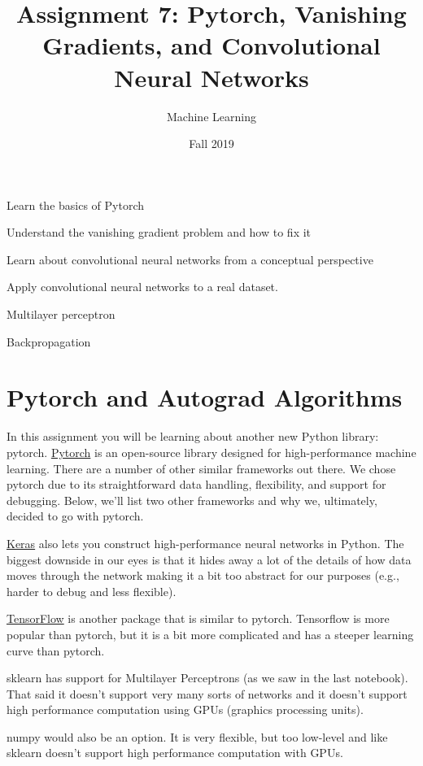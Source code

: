 \documentclass[assignment07_Solutions]{subfiles}
\title{Assignment 7: Pytorch, Vanishing Gradients, and Convolutional Neural Networks}
\author{Machine Learning}
\date{Fall 2019}
\begin{document}
\maketitle
\thispagestyle{firstpage}


\begin{learningobjectives}
\bi
\item Learn the basics of Pytorch
\item Understand the vanishing gradient problem and how to fix it
\item Learn about convolutional neural networks from a conceptual perspective
\item Apply convolutional neural networks to a real dataset.
\ei
\end{learningobjectives}

\begin{priorknowledge}
\bi
\item Multilayer perceptron
\item Backpropagation
\ei
\end{priorknowledge}

\section{Pytorch and Autograd Algorithms}

In this assignment you will be learning about another new Python library: pytorch.  \href{https://pytorch.org/}{Pytorch} is an open-source library designed for high-performance machine learning.  There are a number of other similar frameworks out there.  We chose pytorch due to its straightforward data handling, flexibility, and support for debugging.  Below, we'll list two other frameworks and why we, ultimately, decided to go with pytorch.

\bi
\item \href{https://keras.io/}{Keras} also lets you construct high-performance neural networks in Python.  The biggest downside in our eyes is that it hides away a lot of the details of how data moves through the network making it a bit too abstract for our purposes (e.g., harder to debug and less flexible).
\item \href{https://www.tensorflow.org/}{TensorFlow} is another package that is similar to pytorch.  Tensorflow is more popular than pytorch, but it is a bit more complicated and has a steeper learning curve than pytorch.
\item sklearn has support for Multilayer Perceptrons (as we saw in the last notebook).  That said it doesn't support very many sorts of networks and it doesn't support high performance computation using GPUs (graphics processing units).
\item numpy would also be an option.  It is very flexible, but too low-level and like sklearn doesn't support high performance computation with GPUs.
\ei
\end{document}
